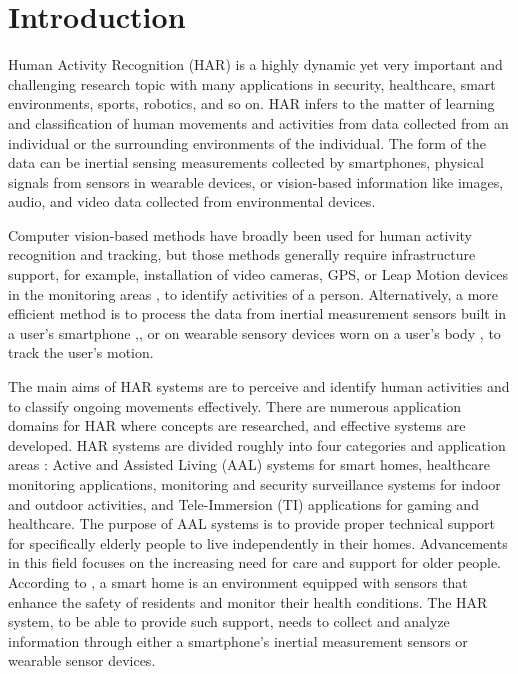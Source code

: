 \documentclass[12pt,conference]{IEEEtran}
\begin{document}

\thispagestyle{plain}\pagestyle{plain}


\section{
\textbf{Introduction}
}

Human Activity Recognition (HAR) is a highly dynamic yet very important and challenging research topic with many applications in security, healthcare, smart environments, sports, robotics, and so on. HAR infers to the matter of learning and classification of human movements and activities from data collected from an individual or the surrounding environments of the individual. The form of the data can be inertial sensing measurements collected by smartphones, physical signals from sensors in wearable devices, or vision-based information like images, audio, and video data collected from environmental devices.

Computer vision-based methods have broadly been used for human activity recognition and tracking, but those methods generally require infrastructure support, for example, installation of video cameras, GPS, or Leap Motion devices \cite{2leap} in the monitoring areas \cite{3poppe2010survey},\cite{4Jaouedi2016HumanAR} to identify activities of a person. Alternatively, a more efficient method is to process the data from inertial measurement sensors built in a user’s smartphone \cite{5kwapisz2011activity},\cite{6kwapisz2010cell}, or on wearable sensory devices worn on a user’s body \cite{7casale2011human},\cite{8krishnan2008real} to track the user’s motion.

The main aims of HAR systems are to perceive and identify human activities and to classify ongoing movements effectively. There are numerous application domains for HAR where concepts are researched, and effective systems are developed. HAR systems are divided roughly into four categories and application areas \cite{9ranasinghe2016review}: Active and Assisted Living (AAL) systems for smart homes, healthcare monitoring applications, monitoring and security surveillance systems for indoor and outdoor activities, and Tele-Immersion (TI) applications for gaming and healthcare. The purpose of AAL systems is to provide proper technical support for specifically elderly people to live independently in their homes. Advancements in this field \cite{10menschner2011reaching} focuses on the increasing need for care and support for older people. According to \cite{11demiris2008senior}, a smart home is an environment equipped with sensors that enhance the safety of residents and monitor their health conditions. The HAR system, to be able to provide such support, needs to collect and analyze information through either a smartphone’s inertial measurement sensors or wearable sensor devices.
\end{document}
